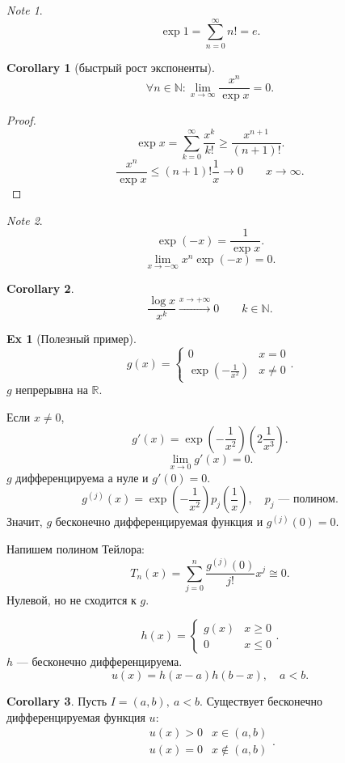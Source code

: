 \documentclass[11pt]{book}
\newcommand{\N}{\mathbb{N}}
\newcommand{\R}{\mathbb{R}}
\renewcommand{\le}{\leqslant}
\renewcommand{\ge}{\geqslant}
\theoremstyle{definition}
\theoremstyle{plain}
\theoremstyle{plain}
\theoremstyle{definition}
\newtheorem*{ex}{Ex}
\newtheorem*{cor}{Corollary}
\theoremstyle{remark}
\newtheorem*{note}{Note}
\begin{document}
\begin{note}
    \[
	\exp 1 = \sum_{n=0}^{\infty} n! = e
    .\]
\end{note}
\begin{cor}[быстрый рост экспоненты]
    \[
	\forall n \in  \N : \lim_{x \to  \infty}  \frac{x^{n}}{\exp x} = 0
    .\]
\end{cor}
\begin{proof}
    \[
	\exp x = \sum_{k =0}^{\infty} \frac{x^{k}}{k!}\ge  \frac{x^{n+1}}{(n+1)!}
    .\]
    \[
	\frac{x^{n}}{\exp x} \le  (n+1)! \frac{1}{x} \longrightarrow 0 \qquad x \to  \infty
    .\]
\end{proof}
\begin{note}
    \[
	\exp(-x) = \frac{1}{\exp x}
    .\]
    \[
	\lim_{x \to  -\infty}  x^{n} \exp (-x) = 0
    .\]
\end{note}
\begin{cor}
    \[
	\frac{\log x}{x^{k}} \stackrel{ x \to  + \infty}{\longrightarrow} 0 \qquad k \in  \N
    .\]
\end{cor}
\begin{ex}[Полезный пример]
    \[
	g(x) = \left\{
	    \begin{array}{ll}
		0 & x = 0 \\
		\exp\left(-\frac{1}{x^2}\right) & x \ne 0
	\end{array}\right.
    .\]
    $ g $ непрерывна на $ \R$.

    Если $ x \ne 0$, \[
	g'(x) = \exp\left(-\frac{1}{x^2} \right)\left(2 \frac{1}{x^3}\right)
    .\]
    \[
	\lim_{x \to  0}  g'(x) = 0
    .\]
    $ g$  дифференцируема а нуле и $ g'(0) = 0$.
    \[
	g^{(j)} (x) = \exp\left(-\frac{1}{x^2}\right) p_j\left(\frac{1}{x}\right), \quad p_j \text{ --- полином}
    .\]
    Значит, $ g$ бесконечно дифференцируемая функция и $ g^{(j)} (0) = 0$.


    Напишем полином Тейлора:
    \[
	T_n(x) =\sum_{j=0}^{n} \frac{g^{(j)} (0)}{j!}x^{j} \cong 0
    .\]
    Нулевой, но не сходится к $ g$.

    \[
	h(x) = \left \{
	    \begin{array}{ll}
		g(x) & x \ge  0\\
		0 & x \le 0
	    \end{array}
	\right .
    .\]
    $ h$ --- бесконечно дифференцируема.
    \[
	u(x) = h(x-a) h(b-x), \quad a<b
    .\]
\end{ex}
\begin{cor}
    Пусть $ I = (a, b), ~ a< b$. Существует бесконечно дифференцируемая функция $ u:$
    \[
	\begin{array}{ll}
	    u(x) >0 & x \in  (a, b) \\
	    u(x) = 0 & x \not\in (a,b)
	\end{array}
    .\]
\end{cor}
\end{document}
